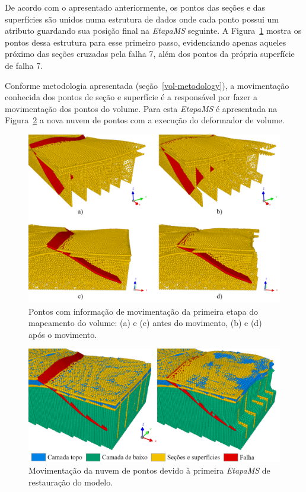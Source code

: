 De acordo com o apresentado anteriormente, os pontos das seções e das superfícies são unidos numa estrutura de dados onde cada ponto possui um atributo guardando sua posição final na \emph{EtapaMS} seguinte. A Figura~\ref{fig-vol-ex-2} mostra os pontos dessa estrutura para esse primeiro passo, evidenciando apenas aqueles próximo das seções cruzadas pela falha 7, além dos pontos da própria superfície de falha 7.

Conforme metodologia apresentada (seção~\ref{vol-metodology}), a movimentação conhecida dos pontos de seção e superfície é a responsável por fazer a movimentação dos pontos do volume. Para esta \emph{EtapaMS} é apresentada na Figura~\ref{fig-vol-ex-3} a nova nuvem de pontos com a execução do deformador de volume.

\begin{figure} [H]
  \begin{center}
    \includegraphics[width=\textwidth]{images/fig-vol-ex-2}
    \caption{Pontos com informação de movimentação da primeira etapa do mapeamento do volume: (a) e (c) antes do movimento, (b) e (d) após o movimento.}\label{fig-vol-ex-2}
  \end{center}
\end{figure}

\begin{figure} [H]
  \begin{center}
    \includegraphics[width=\textwidth]{images/fig-vol-ex-3}
    \caption{Movimentação da nuvem de pontos devido à primeira \emph{EtapaMS} de restauração do modelo.}\label{fig-vol-ex-3}
  \end{center}
\end{figure}

